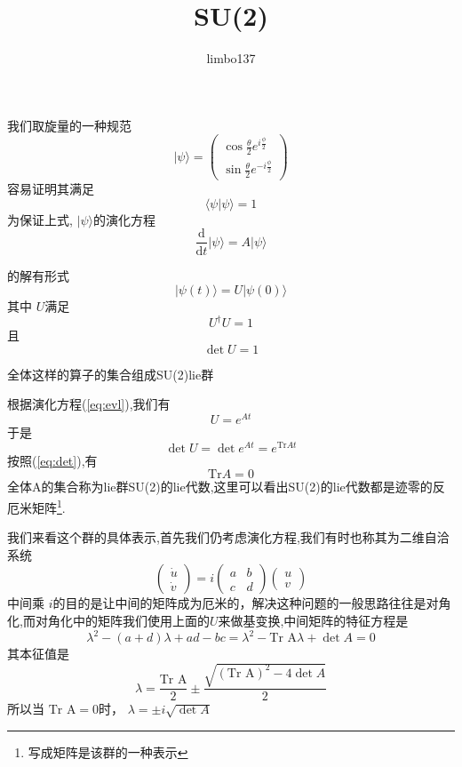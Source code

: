 \documentclass[hyperref,UTF8]{ctexart}
\title{SU(2)}
\author{limbo137}
\begin{document}
\maketitle
我们取旋量的一种规范
\[ \lvert \psi \rangle =\begin{pmatrix}
    \cos \frac{\theta}{2}e^{i \frac{\phi}{2}}\\
    \sin \frac{\theta}{2}e^{-i \frac{\phi}{2}}
\end{pmatrix}\]
容易证明其满足
\[\langle \psi\vert \psi \rangle =1\]
为保证上式, $\vert \psi \rangle$的演化方程
\begin{equation}
    \frac{\mathrm{d}}{\mathrm{d}t}\vert \psi \rangle=A\vert \psi \rangle \label{eq:evl} 
\end{equation}

的解有形式
\[\vert \psi(t) \rangle=U\vert \psi(0) \rangle\]
其中 $U$满足 
\[U^\dagger U=1\]
且
\begin{equation}
    \det U =1 \label{eq:det}
\end{equation}

全体这样的算子的集合组成SU(2)lie群

根据演化方程(\ref{eq:evl}),我们有
\[U=e^{At}\]
于是
\[\det U=\det e^{At}=e^{\text{Tr}At}\]
按照(\ref{eq:det}),有
\[\text{Tr} A=0\]
全体A的集合称为lie群SU(2)的lie代数,这里可以看出SU(2)的lie代数都是迹零的反厄米矩阵\footnote{写成矩阵是该群的一种表示}.

我们来看这个群的具体表示,首先我们仍考虑演化方程,我们有时也称其为二维自洽系统
\[\begin{pmatrix}
    \dot{u}\\\dot{v}
\end{pmatrix}=i\begin{pmatrix}
    a& b\\
    c&d
\end{pmatrix}\begin{pmatrix}
    u\\v
\end{pmatrix}\]
中间乘 $i$的目的是让中间的矩阵成为厄米的，解决这种问题的一般思路往往是对角化,而对角化中的矩阵我们使用上面的$U$来做基变换,中间矩阵的特征方程是
\[\lambda^2-(a+d)\lambda+ad-bc=\lambda^2-\text{Tr A}\lambda+\det A=0\]
其本征值是
\[\lambda=\frac{\text{Tr A}}{2} \pm \frac{\sqrt{(\text{Tr A})^2-4\det A}}{2}\]
所以当 $\text{Tr A}=0$时， $\lambda=\pm i\sqrt{\det A}$ 
\end{document}
